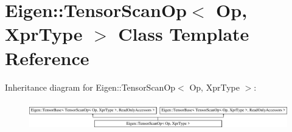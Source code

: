 \hypertarget{class_eigen_1_1_tensor_scan_op}{}\section{Eigen\+:\+:Tensor\+Scan\+Op$<$ Op, Xpr\+Type $>$ Class Template Reference}
\label{class_eigen_1_1_tensor_scan_op}
Inheritance diagram for Eigen\+:\+:Tensor\+Scan\+Op$<$ Op, Xpr\+Type $>$\+:\begin{figure}[H]
\begin{center}
\leavevmode
\includegraphics[height=1.222707cm]{class_eigen_1_1_tensor_scan_op}
\end{center}
\end{figure}
